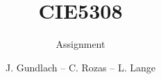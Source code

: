 \documentclass[whitelogo]{tudelft-report}
\begin{document}
\frontmatter


\title[tudelft-white]{CIE5308}
\subtitle[tudelft-black]{Assignment}
\author[tudelft-white]{{J. Gundlach} -- {C. Rozas} -- {L. Lange}}
\makecover[split]




% 

\tableofcontents

\mainmatter











\appendix




\end{document}
